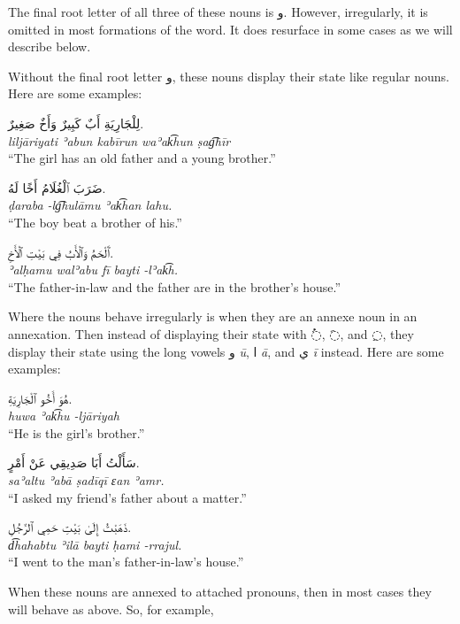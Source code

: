 \documentclass[
  10pt,
]{book}
\begin{document}
The final root letter of all three of these nouns is \foreignlanguage{arabic}{و}. However, irregularly, it is omitted in most formations of the word. It does resurface in some cases as we will describe below.

Without the final root letter \foreignlanguage{arabic}{و}, these nouns display their state like regular nouns. Here are some examples:

\foreignlanguage{arabic}{لِلْجَارِيَةِ أَبٌ کَبِيرٌ وَأَخٌ صَغِيرٌ.}\\
\emph{liljāriyati ʾabun kabīrun waʾak͡hun ṣag͡hīr}\\
\enquote{The girl has an old father and a young brother.}

\foreignlanguage{arabic}{ضَرَبَ ٱلْغُلَامُ أَخًا لَهُ.}\\
\emph{ḍaraba -lg͡hulāmu ʾak͡han lahu.}\\
\enquote{The boy beat a brother of his.}

\foreignlanguage{arabic}{ٱَلْحَمُ وَٱلْأَبُ فِي بَيْتِ ٱلْأَخِ.}\\
\emph{ʾalḥamu walʾabu fī bayti -lʾak͡h.}\\
\enquote{The father-in-law and the father are in the brother's house.}

Where the nouns behave irregularly is when they are an annexe noun in an annexation. Then instead of displaying their state with \foreignlanguage{arabic}{◌ُ}, \foreignlanguage{arabic}{◌َ}, and \foreignlanguage{arabic}{◌ِ}, they display their state using the long vowels \foreignlanguage{arabic}{و} \emph{ū}, \foreignlanguage{arabic}{ا} \emph{ā}, and \foreignlanguage{arabic}{ي} \emph{ī} instead. Here are some examples:

\foreignlanguage{arabic}{هُوَ أَخُو ٱلْجَارِيَةِ.}\\
\emph{huwa ʾak͡hu -ljāriyah}\\
\enquote{He is the girl's brother.}

\foreignlanguage{arabic}{سَأَلْتُ أَبَا صَدِيقِي عَنْ أَمْرٍ.}\\
\emph{saʾaltu ʾabā ṣadīqī ɛan ʾamr.}\\
\enquote{I asked my friend's father about a matter.}

\foreignlanguage{arabic}{ذَهَبْتُ إِلَىٰ بَيْتِ حَمِي ٱلرَّجُلِ.}\\
\emph{d͡hahabtu ʾilā bayti ḥami -rrajul.}\\
\enquote{I went to the man's father-in-law's house.}

When these nouns are annexed to attached pronouns, then in most cases they will behave as above. So, for example,
\end{document}
